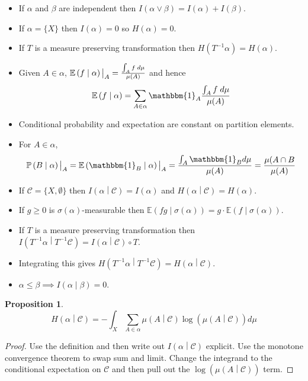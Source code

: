 \documentclass[11pt]{article}
\newcommand{\indic}[1]{\mathbbm{1}_{#1}}
\newcommand\restr[2]{{%
  \left.\kern-\nulldelimiterspace %
  #1 %
  \vphantom{\big|} %
  \right|_{#2} %
  }}
\newcommand{\relmiddle}[1]{\mathrel{}\middle#1\mathrel{}}
\newcommand{\rmv}{\relmiddle|}
\newcommand{\gvn}[2]{\ensuremath{\left(#1\rmv#2\right)}}
\newcommand{\expg}[2]{\ensuremath{\mathbb{E}\gvn{#1}{#2}}}
\newcommand{\infog}[2]{\ensuremath{I\gvn{#1}{#2}}}
\newcommand{\entrg}[2]{\ensuremath{H\gvn{#1}{#2}}}
\newcommand{\probg}[2]{\ensuremath{\mathbb{P}\gvn{#1}{#2}}}
\newtheorem{prop}{Proposition}[section]
\begin{document}
\begin{itemize}
	\item If $\alpha$ and $\beta$ are independent then $I(\alpha\vee\beta)=I(\alpha)+I(\beta)$.
	\item If $\alpha=\{X\}$ then $I(\alpha)=0$ so $H(\alpha)=0$.
	\item If $T$ is a measure preserving transformation then $H(T^{-1}\alpha)=H(\alpha)$.
	\item Given $A\in\alpha$, $\restr{\expg{f}{\alpha}}{A}=\frac{\int_A f \;d\mu}{\mu(A)}$ and hence
		$$\expg{f}{\alpha}=\sum_{A\in\alpha}\indic{A}\frac{\int_A f \;d\mu}{\mu(A)}$$
	\item Conditional probability and expectation are constant on partition elements.
	\item For $A\in\alpha$, 
		$$\restr{\probg{B}{\alpha}}{A}=\restr{\expg{\indic{B}}{\alpha}}{A}=\frac{\int_A \indic{B} d\mu}{\mu(A)}=\frac{\mu(A\cap B}{\mu(A)}$$
	\item If $\mathcal{C}=\{X,\emptyset\}$ then $\infog{\alpha}{\mathcal{C}}=I(\alpha)$ and $\entrg{\alpha}{\mathcal{C}}=H(\alpha)$.
	\item If $g\geq 0$ is $\sigma(\alpha)$-measurable then $\expg{fg}{\sigma(\alpha)}=g\cdot\expg{f}{\sigma(\alpha)}$.
	\item If $T$ is a measure preserving transformation then $\infog{T^{-1}\alpha}{T^{-1}\mathcal{C}}=\infog{\alpha}{\mathcal{C}}\circ T$.
	\item Integrating this gives $\entrg{T^{-1}\alpha}{T^{-1}\mathcal{C}}=\entrg{\alpha}{\mathcal{C}}$.
	\item $\alpha\leq\beta\implies\infog{\alpha}{\beta}=0$.
\end{itemize}


\begin{prop}
	$$\entrg{\alpha}{\mathcal{C}}=-\int_X \sum_{A\in\alpha}\mu\gvn{A}{\mathcal{C}}\log(\mu\gvn{A}{\mathcal{C}})d\mu$$	
\end{prop}

\begin{proof}
Use the definition and then write out $\infog{\alpha}{\mathcal{C}}$ explicit.
Use the monotone convergence theorem to swap sum and limit.
Change the integrand to the conditional expectation on $\mathcal{C}$ and then pull out the $\log(\mu\gvn{A}{\mathcal{C}})$ term.
\end{proof}
\end{document}
